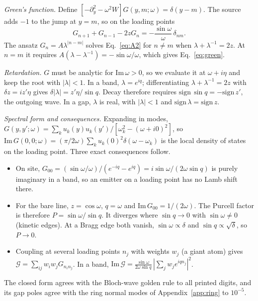 \documentclass[aps,prresearch,twocolumn,superscriptaddress,nofootinbib,longbibliography,floatfix]{revtex4-2}
\newcommand{\G}{\mathcal{G}}
\begin{document}
\emph{Green's function.} Define $[-\partial_y^2-\omega^2W]G(y,m;\omega)=\delta(y-m)$. The source adds $-1$ to the jump at
$y=m$, so on the loading points
\begin{equation}
G_{n+1}+G_{n-1}-2zG_n=-\frac{\sin\omega}{\omega}\,\delta_{nm}.
\label{eq:A2}
\end{equation}
The ansatz $G_n=A\lambda^{|n-m|}$ solves Eq.~\eqref{eq:A2} for $n\neq m$ when $\lambda+\lambda^{-1}=2z$. At $n=m$ it
requires $A(\lambda-\lambda^{-1})=-\sin\omega/\omega$, which gives Eq.~\eqref{eq:green}.

\emph{Retardation.} $G$ must be analytic for $\mathrm{Im}\,\omega>0$, so we evaluate it at $\omega+i\eta$ and keep the
root with $|\lambda|<1$. In a band, $\lambda=e^{iq}$; differentiating $\lambda+\lambda^{-1}=2z$ with $\delta z=iz'\eta$
gives $\delta|\lambda|=z'\eta/\sin q$. Decay therefore requires $\mathrm{sign}\,\sin q=-\mathrm{sign}\,z'$, the outgoing
wave. In a gap, $\lambda$ is real, with $|\lambda|<1$ and $\mathrm{sign}\,\lambda=\mathrm{sign}\,z$.

\emph{Spectral form and consequences.} Expanding in modes,
$G(y,y';\omega)=\sum_ku_k(y)u_k(y')/[\omega_k^2-(\omega+i0)^2]$, so
$\mathrm{Im}\,G(0,0;\omega)=(\pi/2\omega)\sum_ku_k(0)^2\delta(\omega-\omega_k)$ is the local density of states on the
loading point. Three exact consequences follow.
\begin{itemize}
\item On site, $G_{00}=(\sin\omega/\omega)/(e^{-iq}-e^{iq})=i\sin\omega/(2\omega\sin q)$ is purely imaginary in a band,
so an emitter on a loading point has no Lamb shift there.
\item For the bare line, $z=\cos\omega$, $q=\omega$ and $\mathrm{Im}\,G_{00}=1/(2\omega)$. The Purcell factor is
therefore $P=\sin\omega/\sin q$. It diverges where $\sin q\to0$ with $\sin\omega\neq0$ (kinetic edges). At a Bragg
edge both vanish, $\sin\omega\propto\delta$ and $\sin q\propto\sqrt\delta$, so $P\to0$.
\item Coupling at several loading points $n_j$ with weights $w_j$ (a giant atom) gives
$\G=\sum_{ij}w_iw_jG_{n_in_j}$. In a band, $\mathrm{Im}\,\G=\frac{\sin\omega}{2\omega\sin q}\,|\sum_jw_je^{iqn_j}|^2$.
\end{itemize}
The closed form agrees with the Bloch-wave golden rule to all printed digits, and its gap poles agree with the ring
normal modes of Appendix~\ref{app:ring} to $10^{-5}$.

\end{document}
